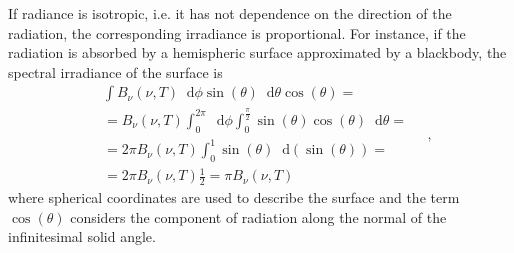 \documentclass[a4paper,10pt,final,twocolumn]{article}
\newcommand{\dd}{\mathop{}\!\mathrm{d}}
\begin{document}
If radiance is isotropic, i.e. it has not dependence on the direction of the radiation, the corresponding irradiance is proportional. For instance, if the radiation is absorbed by a hemispheric surface approximated by a blackbody, the spectral irradiance of the surface is
\begin{equation}
  \label{eq:blackbody_spectral_irradiance_hemisphere}
  \begin{split}
    & \int B_\nu (\nu, T) \dd \phi \sin(\theta) \dd \theta \cos(\theta) = \\
    & = B_\nu (\nu, T) \int_0^{2\pi} \dd \phi \int_0^\frac{\pi}{2} \sin(\theta) \cos(\theta) \dd \theta = \\
    & = 2 \pi B_\nu (\nu, T) \int_0^1 \sin(\theta) \dd(\sin(\theta)) = \\
    & = 2 \pi B_\nu (\nu, T) \frac{1}{2} = \pi B_\nu (\nu, T)
  \end{split}
  \quad ,
\end{equation}
where spherical coordinates are used to describe the surface and the term $\cos(\theta)$ considers the component of radiation along the normal of the infinitesimal solid angle.

\newpage
\printbibliography[heading=bibintoc]
\end{document}
